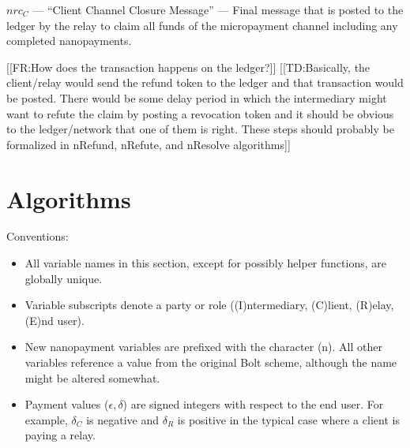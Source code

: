 \documentclass{article}
\newcommand{\flo}[1]{ {\color{blue} [[FR:#1]]}}
\newcommand{\thi}[1]{ {\color{red} [[TD:#1]]}}
\begin{document}
$nrc_C$ --- ``Client Channel Closure Message'' --- Final message that is
posted to the ledger by the relay to claim all funds of the
micropayment channel including any completed nanopayments.


\flo{How does the transaction happens on the ledger?}  \thi{Basically,
  the client/relay would send the refund token to the ledger and that
  transaction would be posted. There would be some delay period in
  which the intermediary might want to refute the claim by posting a
  revocation token and it should be obvious to the ledger/network that
  one of them is right. These steps should probably be formalized in
  nRefund, nRefute, and nResolve algorithms}
\section{Algorithms}\label{algorithms}

Conventions:
\begin{itemize}
\item All variable names in this section, except for possibly helper
  functions, are globally unique.
\item Variable subscripts denote a party or role ((I)ntermediary,
  (C)lient, (R)elay, (E)nd user).
\item New nanopayment variables are prefixed with the character
  (n). All other variables reference a value from the original Bolt
  scheme, although the name might be altered somewhat.
\item Payment values ($\epsilon, \delta$) are signed integers with
  respect to the end user. For example, $\delta_C$ is negative and
  $\delta_R$ is positive in the typical case where a client is paying
  a relay.
\end{itemize}
\end{document}
